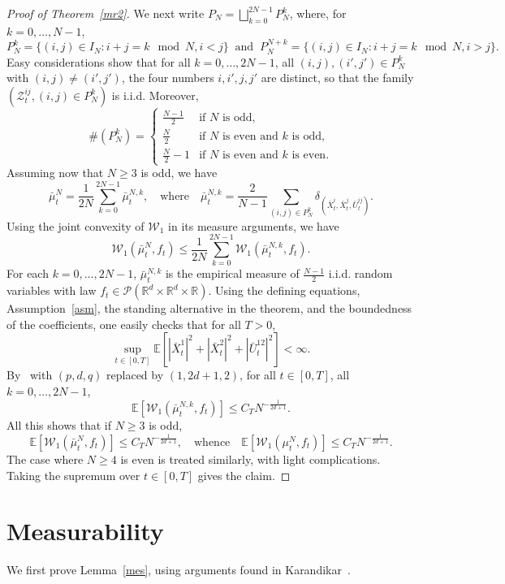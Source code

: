 \documentclass{amsart}
\newcommand{\rr}{{\mathbb{R}}}
\newcommand{\cW}{{\mathcal{W}}}
\newcommand{\cP}{{\mathcal{P}}}
\newcommand{\E}{\mathbb{E}}
\newcommand{\bX}{\bar X}
\newcommand{\bU}{\bar U}
\begin{document}
\begin{proof}[Proof of Theorem~\ref{mr2}]
We next write $P_N= \bigsqcup_{k=0}^{2N-1} P_N^k$,
where, for $k=0,\dots, N-1$,
$$
P_N^k=\{(i,j) \in I_N : i+j=k \!\!\mod N, i<j\}\;\; \text{and} \;\;
P_N^{N+k}=\{(i,j) \in I_N : i+j=k \!\!\mod N, i>j\}.
$$
Easy considerations show that for all $k=0,\dots,2N-1$, all $(i,j),(i',j') \in P_N^k$ with $(i,j)\neq(i',j')$,
the four numbers $i,i',j,j'$ are distinct, so that the family $(\mathcal Z^{ij}_t, (i,j)\in P_N^k)$ is i.i.d.
Moreover,
$$
\#(P_N^k)=\begin{cases}
\frac{N-1}2 & \text{if $N$ is odd},\\
\frac N2& \text{if $N$ is even and $k$ is odd},\\
\frac N2-1& \text{if $N$ is even and $k$ is even}.
\end{cases}
$$
Assuming now that $N\geq 3$ is odd, we have
$$
\bar \mu^N_t=\frac1{2N} \sum_{k=0}^{2N-1} \bar \mu^{N,k}_t,\quad \text{where}\quad
\bar \mu^{N,k}_t=\frac 2{N-1}\sum_{(i,j) \in P_N^k}\delta_{(\bX^{i}_t,\bX^{j}_t,\bU^{ij}_t)}.
$$
Using the joint convexity of $\cW_1$ in its measure arguments, we have
$$
\cW_1(\bar \mu^N_t,f_t)\leq \frac1{2N} \sum_{k=0}^{2N-1}\cW_1(\bar \mu^{N,k}_t,f_t).
$$
For each $k=0,\dots,2N-1$, $\bar \mu^{N,k}_t$ is the empirical measure of $\frac{N-1}2$ i.i.d. random variables
with law $f_t\in \cP(\rr^d\times\rr^d\times\rr)$. Using the defining equations,
Assumption~\ref{asm}, the standing alternative in the theorem, and the boundedness
of the coefficients, one easily checks that for all $T>0$,
$$
\sup_{t\in [0,T]}\E[|\bX^1_t|^2+|\bX^2_t|^2+|\bU^{12}_t|^2]<\infty.
$$
By~\cite[Theorem 1]{fg} with $(p,d,q)$ replaced by $(1,2d+1,2)$, for all $t\in [0,T]$, all $k=0,\dots,2N-1$,
$$
\E[\cW_1(\bar \mu^{N,k}_t,f_t)] \leq C_T N^{-\frac 1{2d+1}}.
$$
All this shows that if $N\geq 3$ is odd,
$$
\E[\cW_1(\bar \mu^N_t,f_t)]\leq C_T N^{-\frac 1{2d+1}},\quad \text{whence}
\quad \E[\cW_1(\mu^N_t,f_t)]\leq C_T N^{-\frac 1{2d+1}}.
$$
The case where $N\geq 4$ is even is treated similarly, with light complications.
Taking the supremum over $t\in[0,T]$ gives the claim.
\end{proof}

\section{Measurability}\label{smes}

We first prove Lemma~\ref{mes}, using arguments found in Karandikar~\cite{k}.
\end{document}
